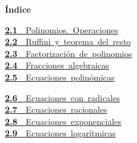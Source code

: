\documentclass[11pt,a4paper]{article}
\begin{document}
\begin{tcolorbox}[colback=fmsurface,colframe=fmsurface,arc=3mm,left=4mm,right=4mm,top=2mm,bottom=2mm]
\small\textbf{Índice}\par\smallskip
\begin{minipage}[t]{0.49\linewidth}\small \mbox{\hyperlink{sec1}{\textbf{\color{fmgreen}2.1}\ \ Polinomios. Operaciones}}\\[3pt]
\mbox{\hyperlink{sec2}{\textbf{\color{fmgreen}2.2}\ \ Ruffini y teorema del resto}}\\[3pt]
\mbox{\hyperlink{sec3}{\textbf{\color{fmgreen}2.3}\ \ Factorización de polinomios}}\\[3pt]
\mbox{\hyperlink{sec4}{\textbf{\color{fmgreen}2.4}\ \ Fracciones algebraicas}}\\[3pt]
\mbox{\hyperlink{sec5}{\textbf{\color{fmgreen}2.5}\ \ Ecuaciones polinómicas}}\\[3pt]\end{minipage}\hfill\begin{minipage}[t]{0.49\linewidth}\small \mbox{\hyperlink{sec6}{\textbf{\color{fmgreen}2.6}\ \ Ecuaciones con radicales}}\\[3pt]
\mbox{\hyperlink{sec7}{\textbf{\color{fmgreen}2.7}\ \ Ecuaciones racionales}}\\[3pt]
\mbox{\hyperlink{sec8}{\textbf{\color{fmgreen}2.8}\ \ Ecuaciones exponenciales}}\\[3pt]
\mbox{\hyperlink{sec9}{\textbf{\color{fmgreen}2.9}\ \ Ecuaciones logarítmicas}}\\[3pt]\end{minipage}
\end{tcolorbox}

\Needspace{5.7cm}
\end{document}
